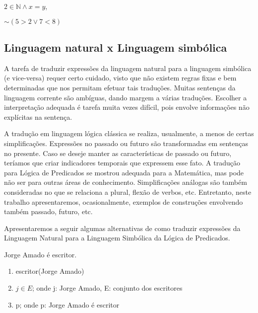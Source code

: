 \hskip 2.5cm $2 \in \mathbb{N} \land x = y$,

\hskip 2.5cm $\sim(5 > 2 \lor 7 < 8)$

\newpage

    \subsection*{Linguagem natural x Linguagem simbólica}

A tarefa de traduzir expressões da linguagem natural para a linguagem simbólica (e vice-versa) requer certo cuidado, visto que não existem regras fixas e bem determinadas que nos permitam efetuar tais traduções.
Muitas sentenças da linguagem corrente são ambíguas, dando margem a várias traduções.
Escolher a interpretação adequada é tarefa muita vezes difícil, pois envolve informações não explícitas na sentença.

A tradução em linguagem lógica clássica se realiza, usualmente, a menos de certas simplificações.
Expressões no passado ou futuro são transformadas em sentenças no presente.
Caso se deseje manter as características de passado ou futuro, teríamos que criar indicadores temporais que expressem esse fato.
A tradução para Lógica de Predicados se mostrou adequada para a Matemática, mas pode não ser para outras áreas de conhecimento.
Simplificações análogas são também consideradas no que se relaciona a plural, flexão de verbos, etc.
Entretanto, neste trabalho apresentaremos, ocasionalmente, exemplos de construções envolvendo também passado, futuro, etc.

\newpage

Apresentaremos a seguir algumas alternativas de como traduzir expressões da Linguagem Natural para a Linguagem Simbólica da Lógica de Predicados.

\setcounter{exemplo}{0} %

\bigskip
\begin{exemplo} Jorge Amado é escritor.
\end{exemplo}

\begin{enumerate}[label=(\roman*)]
    \item escritor(Jorge Amado)
    \item $j \in E$; onde j: Jorge Amado, E: conjunto dos escritores
    \item p; onde p: Jorge Amado é escritor
\end{enumerate}

